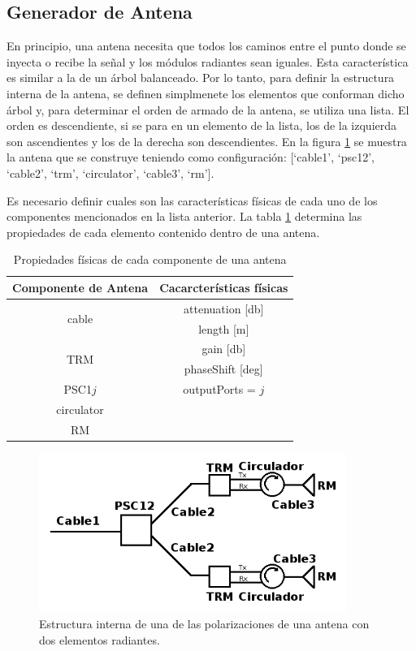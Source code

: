 \subsection{Generador de Antena}

En principio, una antena necesita que todos los caminos entre el punto donde se inyecta o recibe la se\~nal y los m\'odulos 
radiantes sean iguales. Esta caracter\'istica es similar a la de un \'arbol balanceado. Por lo tanto, para definir la 
estructura interna de la antena, se definen simplmenete los elementos que conforman dicho \'arbol y, para determinar el orden 
de armado de la antena, se utiliza una lista. El orden es descendiente, si se para en un elemento de la lista, los de la 
izquierda son ascendientes y los de la derecha son descendientes. En la figura \ref{fig:2RMAntenna} se muestra la antena que 
se construye teniendo como configuración: [\enquote*{cable1}, \enquote*{psc12}, \enquote*{cable2}, \enquote*{trm}, 
\enquote*{circulator}, \enquote*{cable3}, \enquote*{rm}].

Es necesario definir cuales son las características físicas de cada uno de los componentes mencionados en la lista anterior. 
La tabla \ref{tab:propertiesOfComponents} determina las propiedades de cada elemento contenido dentro de una antena. 

\begin{table}[H]
  \footnotesize
  \centering
  \begin{tabular}{|c|c|}
	\hline
	\textbf{Componente de Antena} & \textbf{Cacarcterísticas físicas} \tabularnewline \hline 
	\multirow{2}{*}{cable} &  attenuation [db] \tabularnewline \cline{2-2}
	 & length [m] \tabularnewline \hline 
	\multirow{2}{*}{TRM} & gain [db]\tabularnewline \cline{2-2}
	 & phaseShift [deg] \tabularnewline \hline 
	PSC1$j$ & outputPorts = $j$ \tabularnewline \hline 
	circulator & \tabularnewline \hline 
	RM & \tabularnewline \hline 
  \end{tabular}
  \caption{Propiedades físicas de cada componente de una antena}
  \label{tab:propertiesOfComponents}
\end{table}

\begin{figure}
 \centering
 \includegraphics[width=10cm]{gfx/RFDN.png}
 \caption{Estructura interna de una de las polarizaciones de una antena con dos elementos radiantes.}
 \label{fig:2RMAntenna}
\end{figure}

